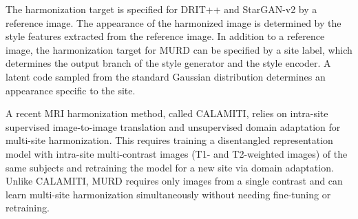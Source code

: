 \documentclass{nature}
\newcommand{\rev}[1]{\textcolor{red}{#1}}
\begin{document}

The harmonization target is specified for DRIT++ and StarGAN-v2 by a reference image. The appearance of the harmonized image is determined by the style features extracted from the reference image. 
In addition to a reference image, the harmonization target for MURD can be specified by a site label, which determines the output branch of the style generator and the style encoder. A latent code sampled from the standard Gaussian distribution determines an appearance specific to the site. 



A recent MRI harmonization method, called CALAMITI\cite{Zuo2021Information}, relies on intra-site supervised image-to-image translation and unsupervised domain adaptation for multi-site harmonization. 
This requires training a disentangled representation model with intra-site multi-contrast images (T1- and T2-weighted images) of the same subjects and retraining the model for a new site via domain adaptation\cite{Varsavsky2020Thomas}.
%
Unlike CALAMITI,  MURD requires only images from a single contrast and can learn multi-site harmonization simultaneously without needing fine-tuning or retraining. 
\end{document}
